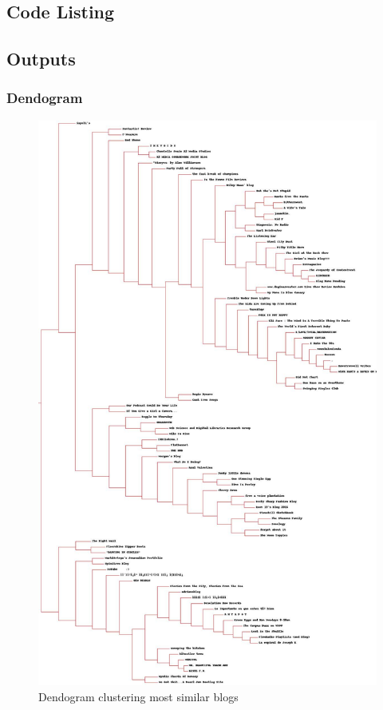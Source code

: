 \subsection{Code Listing}


\newpage

\subsection{Outputs}
\subsubsection{Dendogram}
\begin{figure}[ht]    
    \begin{center}
        \includegraphics[scale=0.24]{clusterblog.jpg}
        \caption{Dendogram clustering most similar blogs}
        \label{Samplet1}
    \end{center}
\end{figure}
\newpage

